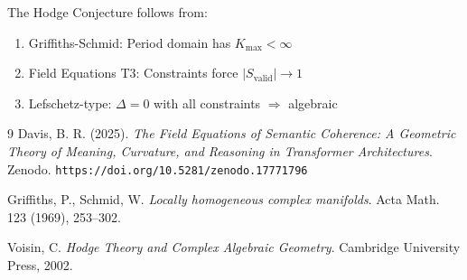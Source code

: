 \documentclass[12pt]{article}
\begin{document}
The Hodge Conjecture follows from:
\begin{enumerate}
\item Griffiths-Schmid: Period domain has $K_{\max} < \infty$
\item Field Equations T3: Constraints force $|S_{\text{valid}}| \to 1$
\item Lefschetz-type: $\Delta = 0$ with all constraints $\Rightarrow$ algebraic
\end{enumerate}

\begin{thebibliography}{9}
Davis, B. R. (2025). \emph{The Field Equations of Semantic Coherence: 
A Geometric Theory of Meaning, Curvature, and Reasoning in Transformer Architectures}. 
Zenodo. \texttt{https://doi.org/10.5281/zenodo.17771796}

Griffiths, P., Schmid, W. \emph{Locally homogeneous complex manifolds}.
Acta Math. 123 (1969), 253--302.

Voisin, C. \emph{Hodge Theory and Complex Algebraic Geometry}.
Cambridge University Press, 2002.
\end{thebibliography}
\end{document}
